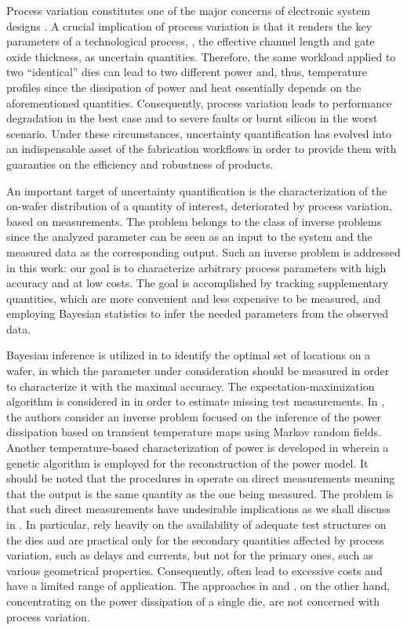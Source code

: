 Process variation constitutes one of the major concerns of electronic system designs \cite{chandrakasan2001, srivastava2010}. A crucial implication of process variation is that it renders the key parameters of a technological process, \eg, the effective channel length and gate oxide thickness, as uncertain quantities.
Therefore, the same workload applied to two ``identical'' dies can lead to two different power and, thus, temperature profiles since the dissipation of power and heat essentially depends on the aforementioned quantities.
Consequently, process variation leads to performance degradation in the best case and to severe faults or burnt silicon in the worst scenario.
Under these circumstances, uncertainty quantification has evolved into an indispensable asset of the fabrication workflows in order to provide them with guaranties on the efficiency and robustness of products.

An important target of uncertainty quantification is the characterization of the on-wafer distribution of a quantity of interest, deteriorated by process variation, based on measurements.
The problem belongs to the class of inverse problems since the analyzed parameter can be seen as an input to the system and the measured data as the corresponding output.
Such an inverse problem is addressed in this work: our goal is to characterize arbitrary process parameters with high accuracy and at low costs.
The goal is accomplished by tracking supplementary quantities, which are more convenient and less expensive to be measured, and employing Bayesian statistics \cite{gelman2004} to infer the needed parameters from the observed data.

Bayesian inference is utilized in \cite{zhang2010} to identify the optimal set of locations on a wafer, in which the parameter under consideration should be measured in order to characterize it with the maximal accuracy.
The expectation-maximization algorithm is considered in \cite{reda2009} in order to estimate missing test measurements.
In \cite{paek2012}, the authors consider an inverse problem focused on the inference of the power dissipation based on transient temperature maps using Markov random fields.
Another temperature-based characterization of power is developed in \cite{mesa-martinez2007} wherein a genetic algorithm is employed for the reconstruction of the power model.
It should be noted that the procedures in \cite{zhang2010, reda2009} operate on direct measurements meaning that the output is the same quantity as the one being measured.
The problem is that such direct measurements have undesirable implications as we shall discuss in .
In particular, \cite{zhang2010, reda2009} rely heavily on the availability of adequate test structures on the dies and are practical only for the secondary quantities affected by process variation, such as delays and currents, but not for the primary ones, such as various geometrical properties.
Consequently, \cite{zhang2010, reda2009} often lead to excessive costs and have a limited range of application.
The approaches in \cite{paek2012} and \cite{mesa-martinez2007}, on the other hand, concentrating on the power dissipation of a single die, are not concerned with process variation.

